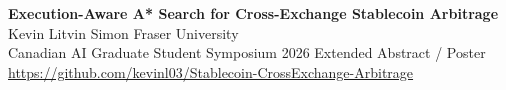 \documentclass[12pt]{article}
\begin{document}
\thispagestyle{empty}

\noindent\colorbox{bannerbg}{\parbox{\dimexpr\linewidth-2\fboxsep}{
\vspace{10mm}
\begin{center}
{\Huge\bfseries\color{bannerfg}Execution-Aware A* Search for Cross-Exchange Stablecoin Arbitrage}\\[6mm]
{\LARGE\color{bannerfg}Kevin Litvin \quad\textbar\quad Simon Fraser University}\\[4mm]
{\large\color{bannerfg}Canadian AI Graduate Student Symposium 2026 \quad\textbullet\quad Extended Abstract / Poster}\\[3mm]
{\normalsize\color{bannerfg}\url{https://github.com/kevinl03/Stablecoin-CrossExchange-Arbitrage}}
\end{center}
\vspace{8mm}
}}

\vspace{6mm}
\end{document}
